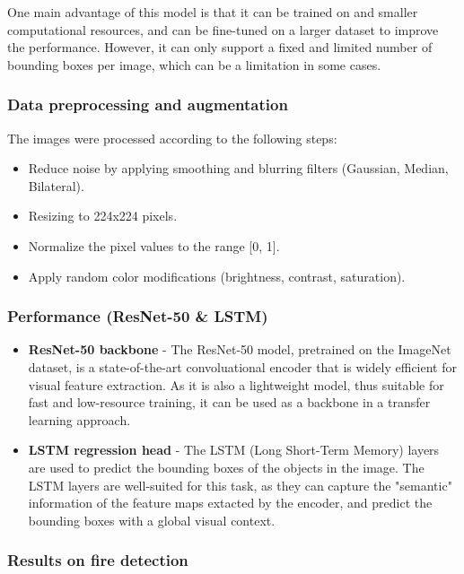 \documentclass{article}
\begin{document}
One main advantage of this model is that it can be trained on and smaller computational resources, and can be fine-tuned on a larger dataset to improve the performance. However, it can only support a fixed and limited number of bounding boxes per image, which can be a limitation in some cases.

\subsubsection{Data preprocessing and augmentation}

The images were processed according to the following steps:

\begin{itemize}
    \item Reduce noise by applying smoothing and blurring filters (Gaussian, Median, Bilateral).
    \item Resizing to 224x224 pixels.
    \item Normalize the pixel values to the range [0, 1].
    \item Apply random color modifications (brightness, contrast, saturation).
\end{itemize}

\subsubsection{Performance (ResNet-50 \& LSTM)}

\begin{itemize}
    \item \textbf{ResNet-50 backbone} - The ResNet-50 model, pretrained on the ImageNet dataset, is a state-of-the-art convoluational encoder that is widely efficient for visual feature extraction. As it is also a lightweight model, thus suitable for fast and low-resource training, it can be used as a backbone in a transfer learning approach.
    \item \textbf{LSTM regression head} - The LSTM (Long Short-Term Memory) layers are used to predict the bounding boxes of the objects in the image. The LSTM layers are well-suited for this task, as they can capture the "semantic" information of the feature maps extacted by the encoder, and predict the bounding boxes with a global visual context.
\end{itemize}

\subsubsection{Results on fire detection}
\end{document}
